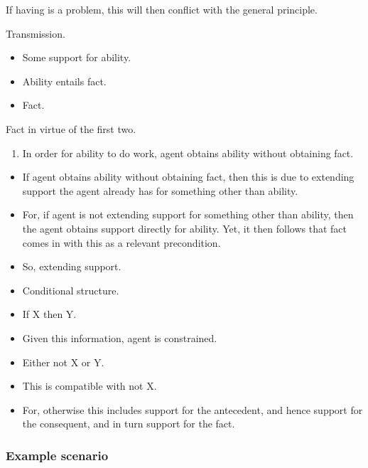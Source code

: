 \documentclass[10pt]{article}
\begin{document}
If having is a problem, this will then conflict with the general principle.

Transmission.

\begin{itemize}
\item Some support for ability.
\item Ability entails fact.
\item Fact.
\end{itemize}

Fact in virtue of the first two.

\begin{enumerate}
\item In order for ability to do work, agent obtains ability without obtaining fact.
\end{enumerate}

\begin{itemize}
\item If agent obtains ability without obtaining fact, then this is due to extending support the agent already has for something other than ability.
\item For, if agent is not extending support for something other than ability, then the agent obtains support directly for ability.
  Yet, it then follows that fact comes in with this as a relevant precondition.
\end{itemize}

\begin{itemize}
\item So, extending support.
\end{itemize}

\begin{itemize}
\item Conditional structure.
\item If X then Y.
\item Given this information, agent is constrained.
\item Either not X or Y.
\end{itemize}

\begin{itemize}
\item This is compatible with not X.
\item For, otherwise this includes support for the antecedent, and hence support for the consequent, and in turn support for the fact.
\end{itemize}

\subsubsection{Example scenario}
\label{sec:example-cases}
\end{document}
